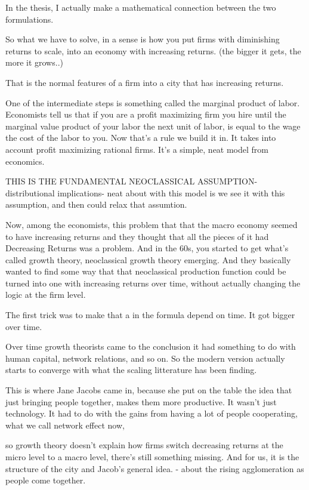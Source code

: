 In the thesis, I actually make a mathematical connection between the two formulations.

So what we have to solve, in a sense is how you put firms with diminishing returns to scale, into an economy with increasing returns. (the bigger it gets, the more it grows..)

That is the normal features of a firm into a city that has increasing returns.

One of the intermediate steps is something called the marginal product of labor. Economists tell us that if you are a profit maximizing firm you hire until the marginal value product of your labor the next unit of labor, is equal to the wage the cost of the labor to you. Now that's a rule we build it in. It takes into account profit maximizing rational firms. It's a simple, neat model from economics.

THIS IS THE FUNDAMENTAL NEOCLASSICAL ASSUMPTION- distributional implications- neat about with this model is we see it with this assumption, and then could relax that assumtion. 

Now, among the economists, this problem that that the macro economy seemed to have increasing returns and they thought that all the pieces of it had Decreasing Returns was a problem. And in the 60s, you started to get what's called growth theory, neoclassical growth theory emerging. And they basically wanted to find some way that that neoclassical production function could be turned into one with increasing returns over time, without actually changing the logic at the firm level.


The first trick was to make that a in the formula depend on time. It got bigger over time.

Over time  growth theorists came to the conclusion it had something to do with human capital, network relations, and so on. So the modern version actually starts to converge with what the scaling litterature has been finding. 

This is where Jane Jacobs came in, because she put on the table the idea that just bringing people together, makes them more productive. It wasn't just technology. It had to do with the gains from having a lot of people cooperating,  what we call  network effect now, 

so growth theory doesn't explain how firms switch decreasing returns at the micro level to a macro level, there's still something missing. 
And for us, it is the structure of the city and Jacob's general idea. - about the rising agglomeration as people come together. 


